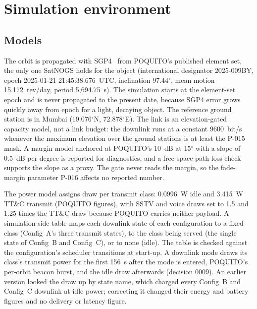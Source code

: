 \documentclass[preprint,12pt]{elsarticle}
\newcommand{\cfgA}{Config~A}
\newcommand{\cfgB}{Config~B}
\newcommand{\cfgC}{Config~C}
\newcommand{\ttc}{TT\&C}
\begin{document}
\section{Simulation environment}\label{sec:sim}

\subsection{Models}

The orbit is propagated with SGP4~\cite{Hoots1980STR3,Vallado2006SGP4} from POQUITO's published element set, the only one SatNOGS holds for the object (international designator 2025-009BY, epoch 2025-01-21 21:45:38.676~UTC, inclination 97.44$^\circ$, mean motion 15.172~rev/day, period 5,694.75~s). The simulation starts at the element-set epoch and is never propagated to the present date, because SGP4 error grows quickly away from epoch for a light, decaying object. The reference ground station is in Mumbai (19.076$^\circ$N, 72.878$^\circ$E). The link is an elevation-gated capacity model, not a link budget: the downlink runs at a constant 9600~bit/s whenever the maximum elevation over the ground stations is at least the P-015 mask. A margin model anchored at POQUITO's 10~dB at 15$^\circ$ with a slope of 0.5~dB per degree is reported for diagnostics, and a free-space path-loss check~\cite{Maral2009SatCom} supports the slope as a proxy. The gate never reads the margin, so the fade-margin parameter P-016 affects no reported number.

The power model assigns draw per transmit class: 0.0996~W idle and 3.415~W \ttc{} transmit (POQUITO figures), with SSTV and voice draws set to 1.5 and 1.25 times the \ttc{} draw because POQUITO carries neither payload. A simulation-side table maps each downlink state of each configuration to a fixed class (\cfgA{}'s three transmit states), to the class being served (the single  state of \cfgB{} and \cfgC{}), or to none (idle). The table is checked against the configuration's scheduler transitions at start-up. A downlink mode draws its class's transmit power for the first 156~s after the mode is entered, POQUITO's per-orbit beacon burst, and the idle draw afterwards (decision 0009). An earlier version looked the draw up by state name, which charged every \cfgB{} and \cfgC{} downlink at idle power; correcting it changed their energy and battery figures and no delivery or latency figure.
\end{document}
